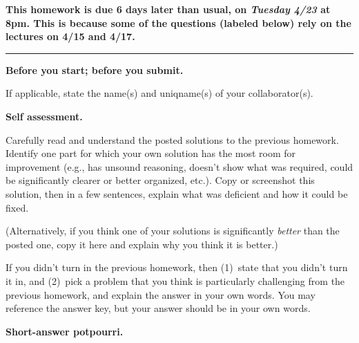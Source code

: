 \documentclass[11pt,addpoints]{exam}
\begin{document}
\noindent \textbf{This homework is due 6 days later than usual, on \emph{Tuesday 4/23} at 8pm.
  This is because some of the questions (labeled below) rely on the lectures on 4/15 and 4/17.}
\medskip
\hrule

\medskip

\hwpreface

\pointsinmargin
{}
\marginpointname{ \points}
\marginbonuspointname{ \bonuspoints}

\begin{questions}
  \addtocounter{question}{-1}

  \question[0] \textbf{Before you start; before you submit.}
  
  If applicable, state the name(s) and uniqname(s) of your collaborator(s).

  \begin{solution}
    
  \end{solution}

  \question[10] \textbf{Self assessment.}
  
  Carefully read and understand the posted solutions to the previous homework.
  Identify one part for which your own solution has the most room for improvement (e.g., has unsound reasoning, doesn’t show what was required, could be significantly clearer or better organized, etc.).
  Copy or screenshot this solution, then in a few sentences, explain what was deficient and how it could be fixed.

  (Alternatively, if you think one of your solutions is significantly \emph{better} than the posted one, copy it here and explain why you think it is better.)

  If you didn't turn in the previous homework, then (1)~state that you didn't turn it in, and (2)~pick a problem that you think is particularly challenging from the previous homework, and explain the answer in your own words.
  You may reference the answer key, but your answer should be in your own words.

  \begin{solution}

  \end{solution}
    
  \question \textbf{Short-answer potpourri.}
  
\end{questions}
\end{document}
